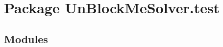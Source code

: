 %
%
%


\section{Package UnBlockMeSolver.test}

    \label{UnBlockMeSolver:test}


\subsection{Modules}

